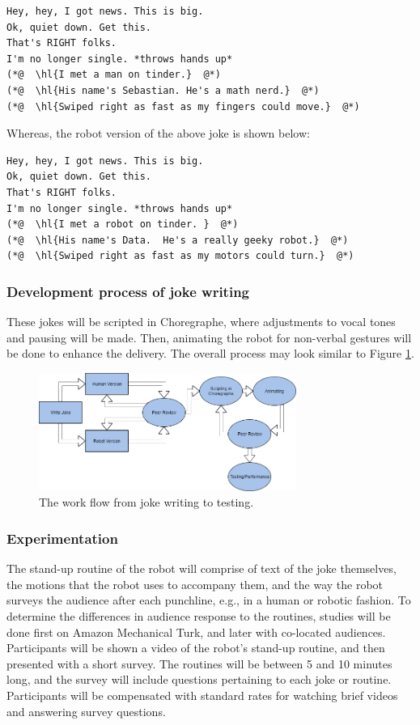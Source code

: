\documentclass[onecolumn, draftclsnofoot,10pt, compsoc]{IEEEtran}
\begin{document}
\begin{lstlisting}
Hey, hey, I got news. This is big.
Ok, quiet down. Get this.
That's RIGHT folks.
I'm no longer single. *throws hands up*
(*@  \hl{I met a man on tinder.}  @*)
(*@  \hl{His name's Sebastian. He's a math nerd.}  @*)
(*@  \hl{Swiped right as fast as my fingers could move.}  @*)
\end{lstlisting}

Whereas, the robot version of the above joke is shown below:

\begin{lstlisting}
Hey, hey, I got news. This is big.
Ok, quiet down. Get this.
That's RIGHT folks.
I'm no longer single. *throws hands up*
(*@  \hl{I met a robot on tinder. }  @*)
(*@  \hl{His name's Data.  He's a really geeky robot.}  @*)
(*@  \hl{Swiped right as fast as my motors could turn.}  @*)
\end{lstlisting}

\subsubsection{Development process of joke writing}
These jokes will be scripted in Choregraphe, where adjustments to vocal tones and pausing will be made.
Then, animating the robot for non-verbal gestures will be done to enhance the delivery.
The overall process may look similar to Figure \ref{fig:write_process}.

\begin{figure}[H]
  \centering
  \includegraphics[width=0.75\textwidth,height=0.75\textheight,keepaspectratio]{joke_writing_process}
  \caption{The work flow from joke writing to testing.}
	\label{fig:write_process}
\end{figure}

\subsubsection{Experimentation}
The stand-up routine of the robot will comprise of text of the joke themselves, the motions that the robot uses to accompany them, and the way the robot surveys the audience after each punchline, e.g., in a human or robotic fashion.
To determine the differences in audience response to the routines, studies will be done first on Amazon Mechanical Turk, and later with co-located audiences.
Participants will be shown a video of the robot's stand-up routine, and then presented with a short survey.
The routines will be between 5 and 10 minutes long, and the survey will include questions pertaining to each joke or routine.
Participants will be compensated with standard rates for watching brief videos and answering survey questions.
\end{document}
